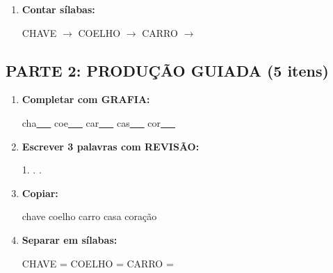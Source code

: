 \begin{exercicio}
\begin{enumerate}
  \item \textbf{Contar sílabas:}
  \begin{center}
  CHAVE $\rightarrow$ \underline{\hspace{0.9cm}} \quad COELHO $\rightarrow$ \underline{\hspace{0.9cm}} \quad CARRO $\rightarrow$ \underline{\hspace{0.9cm}}
  \end{center}

\end{enumerate}

\subsection*{PARTE 2: PRODUÇÃO GUIADA (5 itens)}

\begin{enumerate}[resume]

  \item \textbf{Completar com GRAFIA:}
  \begin{center}
  cha\underline{~~~} \quad coe\underline{~~~} \quad car\underline{~~~} \quad cas\underline{~~~} \quad cor\underline{~~~}
  \end{center}

  \item \textbf{Escrever 3 palavras com REVISÃO:}
  \begin{center}
  1. \underline{\hspace{3cm}} . \underline{\hspace{3cm}} . \underline{\hspace{3cm}}
  \end{center}

  \item \textbf{Copiar:}
  \begin{center}
  chave \quad coelho \quad carro \quad casa \quad coração
  \end{center}

  \item \textbf{Separar em sílabas:}
  \begin{center}
  CHAVE = \underline{\hspace{1cm}} \underline{\hspace{1cm}} \quad COELHO = \underline{\hspace{1cm}} \underline{\hspace{1cm}} \quad CARRO = \underline{\hspace{1cm}} \underline{\hspace{1cm}}
  \end{center}


\end{enumerate}
\end{exercicio}
